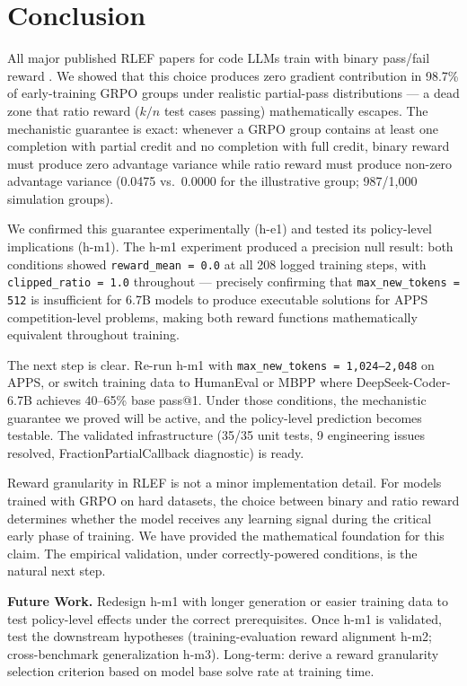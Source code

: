 \section{Conclusion}
\label{sec:conclusion}

All major published RLEF papers for code LLMs train with binary pass/fail reward \citep{le2022coderl,shojaee2023ppocoder,gehring2024rlef,yu2025dapo}. We showed that this choice produces zero gradient contribution in 98.7\% of early-training GRPO groups under realistic partial-pass distributions --- a dead zone that ratio reward ($k/n$ test cases passing) mathematically escapes. The mechanistic guarantee is exact: whenever a GRPO group contains at least one completion with partial credit and no completion with full credit, binary reward must produce zero advantage variance while ratio reward must produce non-zero advantage variance (0.0475 vs.\ 0.0000 for the illustrative group; 987/1,000 simulation groups).

We confirmed this guarantee experimentally (h-e1) and tested its policy-level implications (h-m1). The h-m1 experiment produced a precision null result: both conditions showed \texttt{reward\_mean = 0.0} at all 208 logged training steps, with \texttt{clipped\_ratio = 1.0} throughout --- precisely confirming that \texttt{max\_new\_tokens = 512} is insufficient for 6.7B models to produce executable solutions for APPS competition-level problems, making both reward functions mathematically equivalent throughout training.

The next step is clear. Re-run h-m1 with \texttt{max\_new\_tokens = 1,024--2,048} on APPS, or switch training data to HumanEval or MBPP where DeepSeek-Coder-6.7B achieves 40--65\% base pass@1. Under those conditions, the mechanistic guarantee we proved will be active, and the policy-level prediction becomes testable. The validated infrastructure (35/35 unit tests, 9 engineering issues resolved, FractionPartialCallback diagnostic) is ready.

Reward granularity in RLEF is not a minor implementation detail. For models trained with GRPO on hard datasets, the choice between binary and ratio reward determines whether the model receives any learning signal during the critical early phase of training. We have provided the mathematical foundation for this claim. The empirical validation, under correctly-powered conditions, is the natural next step.

\textbf{Future Work.} Redesign h-m1 with longer generation or easier training data to test policy-level effects under the correct prerequisites. Once h-m1 is validated, test the downstream hypotheses (training-evaluation reward alignment h-m2; cross-benchmark generalization h-m3). Long-term: derive a reward granularity selection criterion based on model base solve rate at training time.
